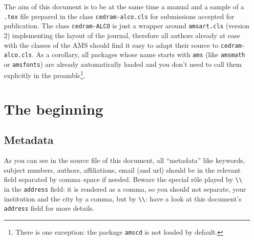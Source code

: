 \documentclass[Unicode]{cedram-alco}
\title
[A \textup{(}useful?\textup{)} guide for authors]
{A guide for authors preparing their accepted manuscript for AlCo}
\author[\initial{M.} \middlename{X.} Mersenne]{\firstname{Marin} \middlename{X.} \lastname{Mersenne}}
\begin{document}
\begin{abstract}
  Here is the abstract, which is short but nevertheless useful.
\end{abstract}


\maketitle

\noindent
The aim of this document is to be at the same time a manual and a
sample of a \verb|.tex| file prepared in the class
\verb|cedram-alco.cls| for submissions accepted for publication. The
class \verb|cedram-ALCO| is just a wrapper around \verb|amsart.cls|
(version 2) implementing the layout of the journal, therefore all
authors already at ease with the classes of the AMS should find it
easy to adapt their source to \verb|cedram-alco.cls|. As a
corollary, all packages whose name starts with \verb|ams| (like
\verb|amsmath| or \verb|amsfonts|) are already automatically loaded
and you don't need to call them explicitly in the
preamble\footnote{There is one exception: the package \texttt{amscd}
  is not loaded by default.}.

\section{The beginning}

\subsection{Metadata}

As you can see in the source file of this document, all ``metadata''
like keywords, subject numbers, authors, affiliations, email (and url)
should be in the relevant field separated by comma--space if
needed. Beware the special r\^ole played by \verb|\\| in the
\verb|address| field: it is rendered as a comma, so you should not
separate, \eg your institution and the city by a comma, but by
\verb|\\|: have a look at this document's \verb|address| field for
more details.
\end{document}
